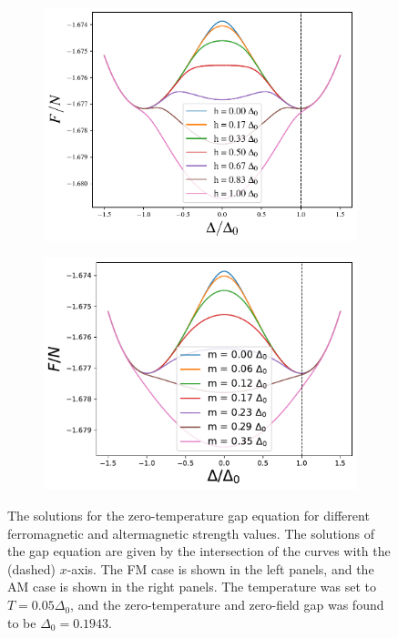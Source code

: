 \documentclass[aps,twocolumn,amsmath,amssymb,preprintnumbers,floatfix,prl,superscriptaddress,longbibliography]{revtex4-2}%
\begin{document}
\begin{figure}[htb]
\begin{subfigure}{0.49 \linewidth}
            \includegraphics[width = \linewidth]{plots_maintext/F_hT=0.01.pdf}
    \end{subfigure}
    \begin{subfigure}{0.49 \linewidth}
        \includegraphics[width = \linewidth]{plots_maintext/F_mT=0.01.pdf}
    \end{subfigure}
    \caption{The solutions for the zero-temperature gap equation for different ferromagnetic and altermagnetic strength values. The solutions of the gap equation are given by the intersection of the curves with the (dashed) $x$-axis.
    The FM case is shown in the left panels, and the AM case is shown in the right panels. 
    The temperature was set to $T=0.05\Delta_0$, and the zero-temperature and zero-field gap was found to be $\Delta_0 = 0.1943$.}
    \label{fig:g}
\end{figure}
\end{document}
